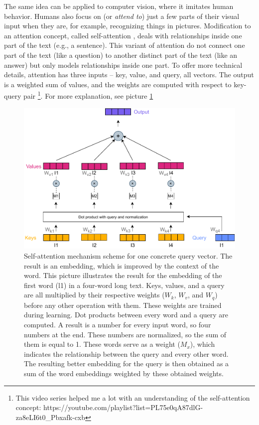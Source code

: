 The same idea can be applied to computer vision, where it imitates human behavior. Humans also focus on (or \textit{attend to}) just a few parts of their visual input when they are, for example, recognizing things in pictures.
Modification to an attention concept, called self-attention \citep{Cheng}, deals with relationships inside one part of the text (e.g., a sentence). This variant of attention do not connect one part of the text (like a question) to another distinct part of the text (like an answer) but only models relationships inside one part. To offer more technical details, attention has three inputs -- key, value, and query, all vectors. The output is a weighted sum of values, and the weights are computed with respect to key-query pair \footnote{This video series helped me a lot with an understanding of the self-attention concept: https://youtube.com/playlist?list=PL75e0qA87dlG-za8eLI6t0\_Pbxafk-cxb}. For more explanation, see picture \ref{pic:att_self}
\begin{figure}[h]
\centering
\includegraphics[width=1\columnwidth]{../img/self_attention1}
\caption{Self-attention mechanism scheme for one concrete query vector. The result is an embedding, which is improved by the context of the word. This picture illustrates the result for the embedding of the first word (l1) in a four-word long text. Keys, values, and a query are all multiplied by their respective weights ($W_k$, $W_v$, and $W_q$) before any other operation with them. These weights are trained during learning. Dot products between every word and a query are computed. A result is a number for every input word, so four numbers at the end. These numbers are normalized, so the sum of them is equal to 1. These words serve as a weight ($M_x$), which indicates the relationship between the query and every other word. The resulting better embedding for the query is then obtained as a sum of the word embeddings weighted by these obtained weights. 
}
\label{pic:att_self}
\end{figure}
